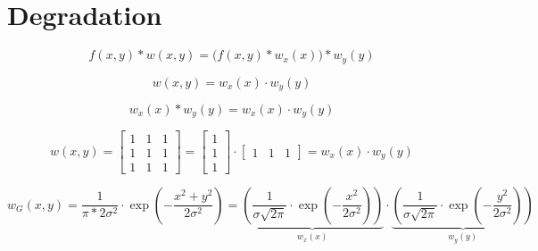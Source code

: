 \documentclass{article}
\begin{document}
\section{Degradation}
\begin{equation}
    f(x,y)*w(x,y) = \Big(f(x,y)*w_{x}(x)\Big) *w_{y}(y)
\end{equation}

\begin{equation}
    w(x,y) = w_{x}(x) \cdot w_{y}(y)
\end{equation}

\begin{equation}
   w_{x}(x) * w_{y}(y) = w_{x}(x) \cdot w_{y}(y) 
\end{equation}


\begin{equation}
    w(x,y) =
    \begin{bmatrix}
        1 & 1 & 1 \\
        1 & 1 & 1 \\
        1 & 1 & 1
    \end{bmatrix}
    =
    \begin{bmatrix}
        1 \\
        1 \\
        1
    \end{bmatrix}
    \cdot
    \begin{bmatrix}
    1 & 1 & 1 
    \end{bmatrix}
    =
    w_{x}(x) \cdot w_{y}(y) 
\end{equation}


\begin{equation}
    w_{G}(x,y) = \frac{1}{\pi*2\sigma^2} \cdot \exp\left(-\frac{x^2+y^2}{2\sigma^2}\right)
    = 
    \underbrace{
    \left(
    \frac{1}{\sigma \sqrt{2\pi}} \cdot \exp\left(-\frac{x^2}{2\sigma^2}\right)
    \right)
    }_{w_{x}(x)}
    \cdot
    \underbrace{
    \left(
    \frac{1}{\sigma \sqrt{2\pi}} \cdot
    \exp\left(-\frac{y^2}{2\sigma^2}\right)
    \right)
    }_{w_{y}(y)}
\end{equation}
\end{document}
